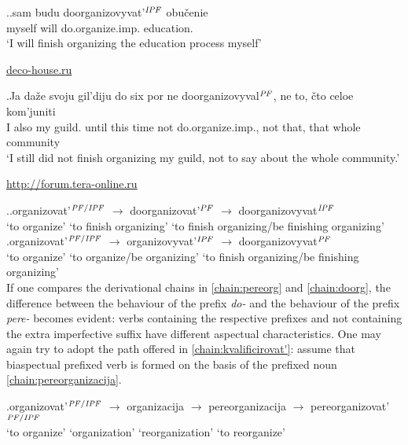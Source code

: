 \ex.\label{ex:doorganizovyvat}\ag.sam budu doorganizovyvat'$^{\mathit{IPF}}$ obu\v{c}enie\\
myself will do.organize.imp. education.\\
\vspace{0.5em}
`I will finish organizing the education process myself'
\begin{flushright}
\vspace{-0.5em}
\url{deco-house.ru}
\end{flushright}
\bg.Ja da\v{z}e svoju gil'diju do six por ne doorganizovyval$^{\mathit{PF}}$, ne to, \v{c}to celoe kom'juniti\\
I also my guild. until this time not do.organize.imp., not that, that whole community\\
\vspace{0.5em}
`I still did not finish organizing my guild, not to say about the whole community.'
\begin{flushright}
\vspace{-0.5em}
 \url{http://forum.tera-online.ru}
\end{flushright}

\ex.\label{chain:doorg}\ag.organizovat'$^{{\mathit{PF}}/{\mathit{IPF}}}$ {$\rightarrow$} {doorganizovat'$^{{\mathit{PF}}}$} {$\rightarrow$} doorganizovyvat$^{{\mathit{IPF}}}$\\
{`to organize'} {} {`to finish organizing'} {} {`to finish organizing/be finishing organizing'}\\
\bg.organizovat'$^{{\mathit{PF}}/{\mathit{IPF}}}$ {$\rightarrow$} {organizovyvat'$^{{\mathit{IPF}}}$} {$\rightarrow$} doorganizovyvat$^{{\mathit{PF}}}$\\
{`to organize'} {} {`to organize/be organizing'} {} {`to finish organizing/be finishing organizing'}\\

If one compares the derivational chains in \ref{chain:pereorg} and \ref{chain:doorg}, the difference between the behaviour of the prefix \textit{do-} and the behaviour of the prefix \textit{pere-} becomes evident: verbs containing the respective prefixes and not containing the extra imperfective suffix have different aspectual characteristics. One may again try to adopt the path offered in \ref{chain:kvalificirovat'}: assume that biaspectual prefixed verb is formed on the basis of the prefixed noun \ref{chain:pereorganizacija}.
 
\exg.\label{chain:pereorganizacija}organizovat'$^{{\mathit{PF}}/{\mathit{IPF}}}$ {$\rightarrow$} organizacija {$\rightarrow$} pereorganizacija {$\rightarrow$} {pereorganizovat'$^{{\mathit{PF}}/{\mathit{IPF}}}$}\\
{`to organize'} {} `organization' {} `reorganization' {} {`to reorganize'}\\

